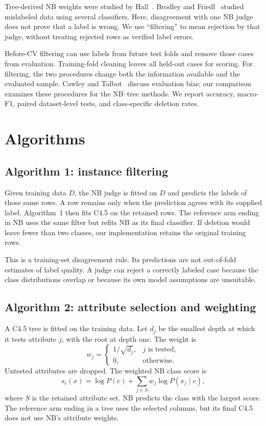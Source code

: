 \documentclass[conference]{IEEEtran}
\begin{document}
Tree-derived NB weights were studied by Hall~\cite{hall2007decision}.
Brodley and Friedl~\cite{brodley1999identifying} studied mislabeled data
using several classifiers. Here, disagreement with one NB judge does not
prove that a label is wrong. We use ``filtering'' to mean rejection by
that judge, without treating rejected rows as verified label errors.

Before-CV filtering can use labels from future test folds and remove those
cases from evaluation. Training-fold cleaning leaves all held-out cases
for scoring. For filtering, the two procedures change both the information available
and the evaluated sample. Cawley and Talbot~\cite{cawley2010overfitting} discuss
evaluation bias; our comparison examines these procedures for the NB--tree
methods. We report accuracy, macro-F1, paired dataset-level tests, and
class-specific deletion rates.

\section{Algorithms}
\subsection{Algorithm 1: instance filtering}
Given training data $D$, the NB judge is fitted on $D$ and predicts the
labels of those same rows. A row remains only when the prediction agrees
with its supplied label. Algorithm~1 then fits C4.5 on the retained rows.
The reference arm ending in NB uses the same filter but refits NB as its
final classifier. If deletion would leave fewer than two classes, our
implementation retains the original training rows.

This is a training-set disagreement rule. Its predictions are not
out-of-fold estimates of label quality. A judge can reject a correctly
labeled case because the class distributions overlap or because its own
model assumptions are unsuitable.

\subsection{Algorithm 2: attribute selection and weighting}
A C4.5 tree is fitted on the training data. Let $d_j$ be the smallest depth
at which it tests attribute $j$, with the root at depth one. The weight is
\begin{equation}
 w_j = \begin{cases}1/\sqrt{d_j}, & j\text{ is tested},\\
                    0, & \text{otherwise}.\end{cases}
\end{equation}
Untested attributes are dropped. The weighted NB class score is
\begin{equation}
 s_c(x)=\log P(c)+\sum_{j\in S}w_j\log P(x_j\mid c),
\end{equation}
where $S$ is the retained attribute set. NB predicts the class with the
largest score. The reference arm ending in a tree uses the selected
columns, but its final C4.5 does not use NB's attribute weights.
\end{document}
